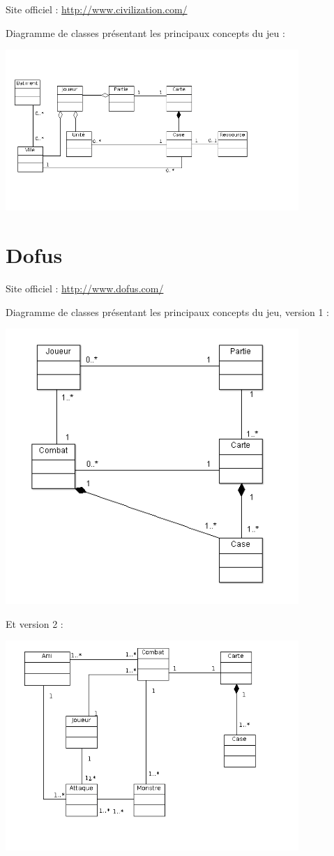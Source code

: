 \documentclass[a4paper,10pt]{report}
\begin{document}
    Site officiel : \url{http://www.civilization.com/}
    
    Diagramme de classes présentant les principaux concepts du jeu : 
    
		\includegraphics[width=420px]{diagrammes/concept_civilization.png}
    

	\section{Dofus}
	
    Site officiel : \url{http://www.dofus.com/}

    Diagramme de classes présentant les principaux concepts du jeu, version 1 : 
    
		\includegraphics[width=420px]{diagrammes/classdiagram_dofus.png}
    
    Et version 2 :
     
		\includegraphics[width=420px]{diagrammes/concept_dofus.png}
\end{document}
